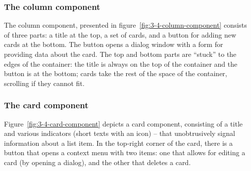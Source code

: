 \subsubsection{The column component}
The column component, presented in figure~\ref{fig:3-4-column-component} consists of three parts: a title at the top, a set of cards, and a button for adding new cards at the bottom.
The button opens a dialog window with a form for providing data about the card.
The top and bottom parts are \enquote{stuck} to the edges of the container: the title is always on the top of the container and the button is at the bottom;
cards take the rest of the space of the container, scrolling if they cannot fit.

\subsubsection{The card component}
Figure~\ref{fig:3-4-card-component} depicts a card component, consisting of a title and various indicators (short texts with an icon) -- that unobtrusively signal information about a list item.
In the top-right corner of the card, there is a button that opens a context menu with two items: one that allows for editing a card (by opening a dialog), and the other that deletes a card.

